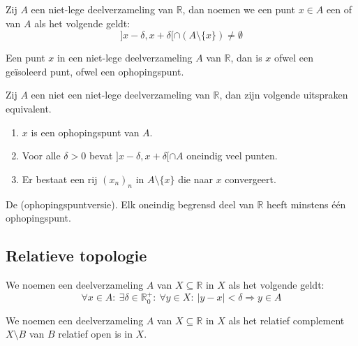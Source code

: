 \documentclass[main.tex]{subfiles}
\begin{document}
\begin{de}
  Zij $A$ een niet-lege deelverzameling van $\mathbb{R}$, dan noemen we een punt $x\in A$ een  of  van $A$ als het volgende geldt:
  \[ ]x-\delta,x+\delta[ \cap (A \setminus \{x\}) \neq \emptyset \]
\end{de}

\begin{st}
  Een punt $x$ in een niet-lege deelverzameling $A$ van $\mathbb{R}$, dan is $x$ ofwel een ge\"isoleerd punt, ofwel een ophopingspunt.
\end{st}

\begin{pr}
  Zij $A$ een niet een niet-lege deelverzameling van $\mathbb{R}$, dan zijn volgende uitspraken equivalent.
  \begin{enumerate}
  \item $x$ is een ophopingspunt van $A$.
  \item Voor alle $\delta > 0$ bevat $]x-\delta,x+\delta[ \cap A$ oneindig veel punten.
  \item Er bestaat een rij $(x_{n})_{n}$ in $A\setminus \{x\}$ die naar $x$ convergeert.  
  \end{enumerate}
\end{pr}

\begin{st}
  De  (ophopingspuntversie).
  Elk oneindig begrensd deel van $\mathbb{R}$ heeft minstens \'e\'en ophopingspunt.
\end{st}

\subsection{Relatieve topologie}
\label{sec:relatieve-topologie}

\begin{de}
  We noemen een deelverzameling $A$ van $X\subseteq \mathbb{R}$  in $X$ als het volgende geldt:
  \[ \forall x\in A:\ \exists \delta \in \mathbb{R}_{0}^{+}:\ \forall y\in X:\ |y-x| < \delta \Rightarrow y \in A \]
\end{de}

\begin{de}
  We noemen een deelverzameling $A$ van $X\subseteq \mathbb{R}$  in $X$ als het relatief complement $X\setminus B$ van $B$ relatief open is in $X$.
\end{de}
\end{document}
